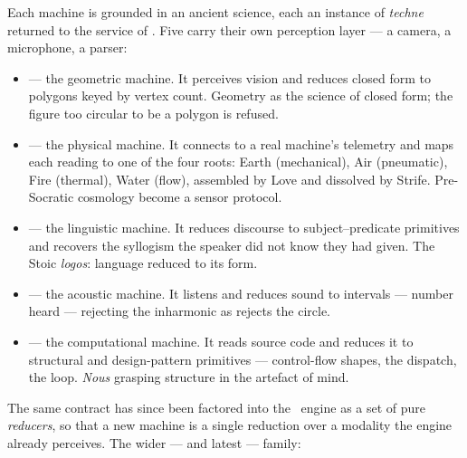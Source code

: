 Each machine is grounded in an ancient science, each an instance of \emph{techne}
returned to the service of \physis. Five carry their own perception layer ---
a camera, a microphone, a parser:

\begin{itemize}
\item {} --- the geometric machine. It perceives vision and reduces
  closed form to polygons keyed by vertex count. Geometry as the science of
  closed form; the figure too circular to be a polygon is refused.
\item {} --- the physical machine. It connects to a real
  machine's telemetry and maps each reading to one of the four roots: Earth
  (mechanical), Air (pneumatic), Fire (thermal), Water (flow), assembled by Love
  and dissolved by Strife. Pre-Socratic cosmology become a sensor protocol.
\item {} --- the linguistic machine. It reduces discourse to
  subject--predicate primitives and recovers the syllogism the speaker did not
  know they had given. The Stoic \emph{logos}: language reduced to its form.
\item {} --- the acoustic machine. It listens and reduces sound
  to intervals --- number heard --- rejecting the inharmonic as 
  rejects the circle.
\item {} --- the computational machine. It reads source code and
  reduces it to structural and design-pattern primitives --- control-flow shapes,
  the dispatch, the loop. \emph{Nous} grasping structure in the artefact of mind.
\end{itemize}

\noindent The same contract has since been factored into the \physis\ engine as
a set of pure \emph{reducers}, so that a new machine is a single reduction over a
modality the engine already perceives. The wider --- and latest --- family:


